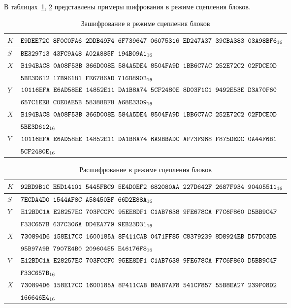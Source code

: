 \label{TEST.CBC}

В таблицах~\ref{Table.TEST.CBCE}, \ref{Table.TEST.CBCD} 
представлены примеры шифрования в режиме сцепления блоков. 

\begin{table}[H]
\caption{Зашифрование в режиме сцепления блоков}\label{Table.TEST.CBCE}
\begin{tabular}{|l|l|}
\hline
$K$ & 
$\texttt{E9DEE72C~8F0C0FA6~2DDB49F4~6F739647~06075316~ED247A37~39CBA383~03A98BF6}_{16}$\\
\hline
$S$ & 
$\texttt{BE329713~43FC9A48~A02A885F~194B09A1}_{16}$\\
\ddhline
$X$ &
$\texttt{B194BAC8~0A08F53B~366D008E~584A5DE4~8504FA9D~1BB6C7AC~252E72C2~02FDCE0D}$\\
&
$\texttt{5BE3D612~17B96181~FE6786AD~716B890B}_{16}$\\
\dhline
$Y$ &
$\texttt{10116EFA~E6AD58EE~14852E11~DA1B8A74~5CF2480E~8D03F1C1~9492E53E~D3A70F60}$\\
&
$\texttt{657C1EE8~C0E0AE5B~58388BF8~A68E3309}_{16}$\\
\ddhline
$X$ &
$\texttt{B194BAC8~0A08F53B~366D008E~584A5DE4~8504FA9D~1BB6C7AC~252E72C2~02FDCE0D}$\\
&
$\texttt{5BE3D612}_{16}$\\
\dhline
$Y$ &
$\texttt{10116EFA~E6AD58EE~14852E11~DA1B8A74~6A9BBADC~AF73F968~F875DEDC~0A44F6B1}$\\
&
$\texttt{5CF2480E}_{16}$\\
\hline
\end{tabular}
\end{table}

\begin{table}[H]
\caption{Расшифрование в режиме сцепления блоков}\label{Table.TEST.CBCD}
\begin{tabular}{|l|l|}
\hline
$K$ & 
$\texttt{92BD9B1C~E5D14101~5445FBC9~5E4D0EF2~682080AA~227D642F~2687F934~90405511}_{16}$\\
\hline
$S$ & 
$\texttt{7ECDA4D0~1544AF8C~A58450BF~66D2E88A}_{16}$\\
\ddhline
$Y$ &
$\texttt{E12BDC1A~E28257EC~703FCCF0~95EE8DF1~C1AB7638~9FE678CA~F7C6F860~D5BB9C4F}$\\
& 
$\texttt{F33C657B~637C306A~DD4EA779~9EB23D31}_{16}$\\
\dhline
$X$ &
$\texttt{730894D6~158E17CC~1600185A~8F411CAB~0471FF85~C8379239~8D8924EB~D57D03DB}$\\
&
$\texttt{95B97A9B~7907E4B0~20960455~E46176F8}_{16}$\\
\ddhline
$Y$ &
$\texttt{E12BDC1A~E28257EC~703FCCF0~95EE8DF1~C1AB7638~9FE678CA~F7C6F860~D5BB9C4F}$\\
& 
$\texttt{F33C657B}_{16}$\\
\dhline
$X$ &
$\texttt{730894D6~158E17CC~1600185A~8F411CAB~B6AB7AF8~541CF857~55B8EA27~239F08D2}$\\
&
$\texttt{166646E4}_{16}$\\
\hline
\end{tabular}
\end{table}

